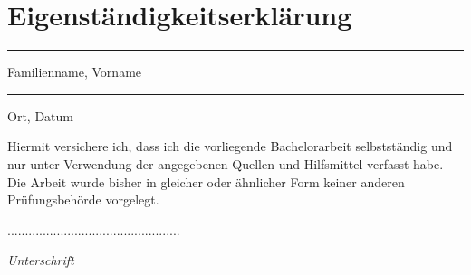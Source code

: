 \chapter*{Eigenständigkeitserklärung}

\thispagestyle{empty}

\vspace{2cm}

\parbox{5cm}{\centering\hrule\medskip Familienname, Vorname}
\vspace{3cm}
\hfill
\parbox{5cm}{\centering\hrule\medskip Ort, Datum}


\vspace{.5cm}

\flushleft

Hiermit versichere ich, dass ich die vorliegende Bachelorarbeit selbstständig und nur unter
Verwendung der angegebenen Quellen und Hilfsmittel verfasst habe. Die Arbeit wurde bisher
in gleicher oder ähnlicher Form keiner anderen Prüfungsbehörde vorgelegt.
\vspace{20mm}
\begin{flushright}
.................................................

\textit{Unterschrift}

\end{flushright}

												
